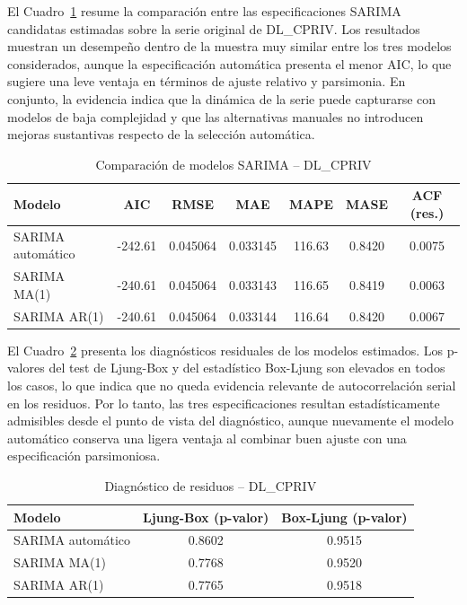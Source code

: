 \documentclass[11pt]{article}
\begin{document}
El Cuadro~\ref{tab:sarima_cpriv} resume la comparación entre las especificaciones SARIMA candidatas estimadas sobre la serie original de DL\_CPRIV. Los resultados muestran un desempeño dentro de la muestra muy similar entre los tres modelos considerados, aunque la especificación automática presenta el menor AIC, lo que sugiere una leve ventaja en términos de ajuste relativo y parsimonia. En conjunto, la evidencia indica que la dinámica de la serie puede capturarse con modelos de baja complejidad y que las alternativas manuales no introducen mejoras sustantivas respecto de la selección automática.

\begin{table}[H]
\centering
\caption{Comparación de modelos SARIMA – DL\_CPRIV}
\label{tab:sarima_cpriv}
\begin{tabular}{lcccccc}
\hline
Modelo & AIC & RMSE & MAE & MAPE & MASE & ACF (res.) \\
\hline
SARIMA automático & -242.61 & 0.045064 & 0.033145 & 116.63 & 0.8420 & 0.0075 \\
SARIMA MA(1)      & -240.61 & 0.045064 & 0.033143 & 116.65 & 0.8419 & 0.0063 \\
SARIMA AR(1)      & -240.61 & 0.045064 & 0.033144 & 116.64 & 0.8420 & 0.0067 \\
\hline
\end{tabular}
\end{table}

El Cuadro~\ref{tab:diag_cpriv} presenta los diagnósticos residuales de los modelos estimados. Los p-valores del test de Ljung-Box y del estadístico Box-Ljung son elevados en todos los casos, lo que indica que no queda evidencia relevante de autocorrelación serial en los residuos. Por lo tanto, las tres especificaciones resultan estadísticamente admisibles desde el punto de vista del diagnóstico, aunque nuevamente el modelo automático conserva una ligera ventaja al combinar buen ajuste con una especificación parsimoniosa.

\begin{table}[H]
\centering
\caption{Diagnóstico de residuos – DL\_CPRIV}
\label{tab:diag_cpriv}
\begin{tabular}{lcc}
\hline
Modelo & Ljung-Box (p-valor) & Box-Ljung (p-valor) \\
\hline
SARIMA automático & 0.8602 & 0.9515 \\
SARIMA MA(1)      & 0.7768 & 0.9520 \\
SARIMA AR(1)      & 0.7765 & 0.9518 \\
\hline
\end{tabular}
\end{table}
\end{document}
